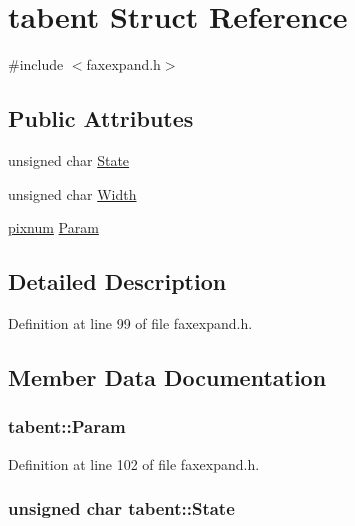 \hypertarget{structtabent}{\section{tabent Struct Reference}
\label{structtabent}
}


{\ttfamily \#include $<$faxexpand.\+h$>$}

\subsection*{Public Attributes}
\begin{DoxyCompactItemize}
\item 
unsigned char \hyperlink{structtabent_a9c74ffbd15ab3a5b59d807d7a4612e8d}{State}
\item 
unsigned char \hyperlink{structtabent_a89077787a5a69f73b7706c970df3700e}{Width}
\item 
\hyperlink{faxexpand_8h_abb85bbcaaab5f47b32c9c44b6b5afc0d}{pixnum} \hyperlink{structtabent_a0b90f27d00c0929fc8a17d8a61dd84b5}{Param}
\end{DoxyCompactItemize}


\subsection{Detailed Description}


Definition at line 99 of file faxexpand.\+h.



\subsection{Member Data Documentation}
\hypertarget{structtabent_a0b90f27d00c0929fc8a17d8a61dd84b5}{
\subsubsection[{Param}]{ tabent\+::\+Param}}\label{structtabent_a0b90f27d00c0929fc8a17d8a61dd84b5}


Definition at line 102 of file faxexpand.\+h.

\hypertarget{structtabent_a9c74ffbd15ab3a5b59d807d7a4612e8d}{
\subsubsection[{State}]{\setlength{\rightskip}{0pt plus 5cm}unsigned char tabent\+::\+State}}\label{structtabent_a9c74ffbd15ab3a5b59d807d7a4612e8d}


